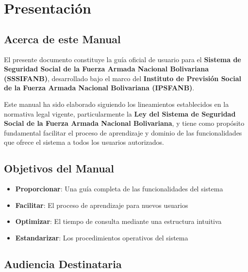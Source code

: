 
\chapter*{Presentación}

\section*{Acerca de este Manual}

El presente documento constituye la guía oficial de usuario para el \textbf{Sistema de Seguridad Social de la Fuerza Armada Nacional Bolivariana (SSSIFANB)}, desarrollado bajo el marco del \textbf{Instituto de Previsión Social de la Fuerza Armada Nacional Bolivariana (IPSFANB)}.

Este manual ha sido elaborado siguiendo los lineamientos establecidos en la normativa legal vigente, particularmente la \textbf{Ley del Sistema de Seguridad Social de la Fuerza Armada Nacional Bolivariana}, y tiene como propósito fundamental facilitar el proceso de aprendizaje y dominio de las funcionalidades que ofrece el sistema a todos los usuarios autorizados.

\section*{Objetivos del Manual}

\begin{itemize}[leftmargin=*]
    \item \textbf{Proporcionar}: Una guía completa de las funcionalidades del sistema
    \item \textbf{Facilitar}: El proceso de aprendizaje para nuevos usuarios
    \item \textbf{Optimizar}: El tiempo de consulta mediante una estructura intuitiva
    \item \textbf{Estandarizar}: Los procedimientos operativos del sistema
\end{itemize}

\section*{Audiencia Destinataria}

